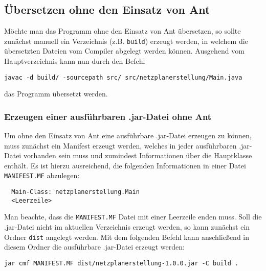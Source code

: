 \subsection{\"Ubersetzen ohne den Einsatz von Ant}

M\"ochte man das Programm ohne den Einsatz von Ant \"ubersetzen, so
sollte zun\"achst manuell ein Verzeichnis (z.B. \texttt{build})
erzeugt werden, in welchem die \"ubersetzten Dateien vom Compiler
abgelegt werden k\"onnen. Ausgehend vom Hauptverzeichnis kann nun
durch den Befehl
\begin{verbatim}
javac -d build/ -sourcepath src/ src/netzplanerstellung/Main.java
\end{verbatim}
das Programm \"ubersetzt werden.

\subsubsection{Erzeugen einer ausf\"uhrbaren .jar-Datei ohne Ant}

Um ohne den Einsatz von Ant eine ausf\"uhrbare .jar-Datei erzeugen zu
k\"onnen, muss zun\"achst ein Manifest erzeugt werden, welches in
jeder ausf\"uhrbaren .jar-Datei vorhanden sein muss und zumindest
Informationen \"uber die Hauptklasse enth\"alt. Es ist hierzu
ausreichend, die folgenden Informationen in einer Datei
\texttt{MANIFEST.MF} abzulegen:
\lstset{
  numbers=left
}
\begin{lstlisting}
  Main-Class: netzplanerstellung.Main
  <Leerzeile>
\end{lstlisting}
Man beachte, dass die \texttt{MANIFEST.MF} Datei mit einer Leerzeile
enden muss.
Soll die .jar-Datei nicht im aktuellen Verzeichnis erzeugt werden, so
kann zun\"achst ein Ordner \texttt{dist} angelegt werden. Mit dem
folgenden Befehl kann anschlie{\ss}end in diesem Ordner die
ausf\"uhrbare .jar-Datei erzeugt werden:
\begin{verbatim}
jar cmf MANIFEST.MF dist/netzplanerstellung-1.0.0.jar -C build .
\end{verbatim}

